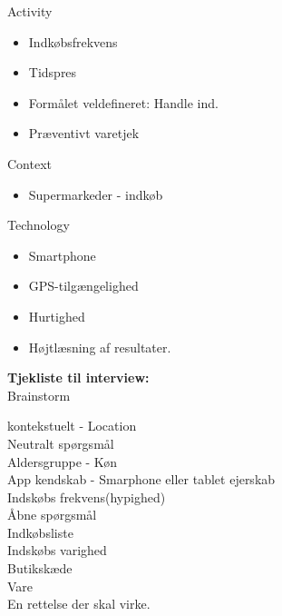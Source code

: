 \documentclass[12pt]{article}
\begin{document}
Activity
\begin{itemize}
\item Indkøbsfrekvens
\item Tidspres
\item Formålet veldefineret: Handle ind.
\item Præventivt varetjek
\end{itemize}


Context
\begin{itemize}
\item Supermarkeder - indkøb
\end{itemize}


Technology
\begin{itemize}
\item Smartphone
\item GPS-tilgængelighed
\item Hurtighed
\item Højtlæsning af resultater.
\end{itemize}

\textbf{Tjekliste til interview:}\\


Brainstorm

  kontekstuelt - Location \\

  Neutralt sp\o rgsm\aa l \\

  Aldersgruppe - K\o n \\

  App kendskab - Smarphone eller tablet ejerskab \\ 

  Indsk\o bs frekvens(hypighed) \\

  \AA bne sp\o rgsm\aa l \\ 

  Indk\o bsliste \\
  
  Indsk\o bs varighed \\
  
  Butiksk\ae de \\

  Vare \\
 
 En rettelse der skal virke.   
\end{document}
